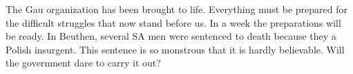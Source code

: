 
The Gau organization has been brought to life. Everything must be prepared for the difficult struggles that now stand before us. In a week the preparations will be ready. In Beuthen, several SA men were sentenced to death because they  a Polish insurgent. This sentence is so monstrous that it is hardly believable. Will the government dare to carry it out?